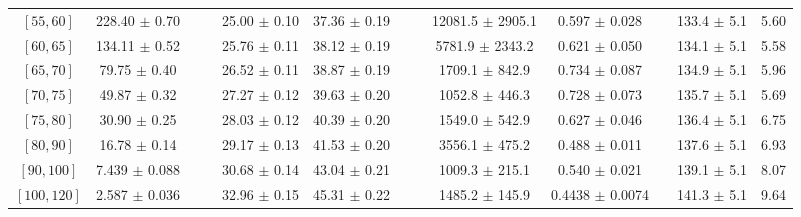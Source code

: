 \begin{tabular}{c||c|c|c|c|c|c|c|c|c|c|c||c}
$[55, 60]$ & 228.40 $\pm$ 0.70 &  &  & 25.00 $\pm$ 0.10 & 37.36 $\pm$ 0.19 &  &  & 12081.5 $\pm$ 2905.1 & 0.597 $\pm$ 0.028 &  & 133.4 $\pm$ 5.1 & 5.60\\
$[60, 65]$ & 134.11 $\pm$ 0.52 &  &  & 25.76 $\pm$ 0.11 & 38.12 $\pm$ 0.19 &  &  & 5781.9 $\pm$ 2343.2 & 0.621 $\pm$ 0.050 &  & 134.1 $\pm$ 5.1 & 5.58\\
$[65, 70]$ & 79.75 $\pm$ 0.40 &  &  & 26.52 $\pm$ 0.11 & 38.87 $\pm$ 0.19 &  &  & 1709.1 $\pm$ 842.9 & 0.734 $\pm$ 0.087 &  & 134.9 $\pm$ 5.1 & 5.96\\
$[70, 75]$ & 49.87 $\pm$ 0.32 &  &  & 27.27 $\pm$ 0.12 & 39.63 $\pm$ 0.20 &  &  & 1052.8 $\pm$ 446.3 & 0.728 $\pm$ 0.073 &  & 135.7 $\pm$ 5.1 & 5.69\\
$[75, 80]$ & 30.90 $\pm$ 0.25 &  &  & 28.03 $\pm$ 0.12 & 40.39 $\pm$ 0.20 &  &  & 1549.0 $\pm$ 542.9 & 0.627 $\pm$ 0.046 &  & 136.4 $\pm$ 5.1 & 6.75\\
$[80, 90]$ & 16.78 $\pm$ 0.14 &  &  & 29.17 $\pm$ 0.13 & 41.53 $\pm$ 0.20 &  &  & 3556.1 $\pm$ 475.2 & 0.488 $\pm$ 0.011 &  & 137.6 $\pm$ 5.1 & 6.93\\
$[90, 100]$ & 7.439 $\pm$ 0.088 &  &  & 30.68 $\pm$ 0.14 & 43.04 $\pm$ 0.21 &  &  & 1009.3 $\pm$ 215.1 & 0.540 $\pm$ 0.021 &  & 139.1 $\pm$ 5.1 & 8.07\\
$[100, 120]$ & 2.587 $\pm$ 0.036 &  &  & 32.96 $\pm$ 0.15 & 45.31 $\pm$ 0.22 &  &  & 1485.2 $\pm$ 145.9 & 0.4438 $\pm$ 0.0074 &  & 141.3 $\pm$ 5.1 & 9.64\\
\end{tabular}
